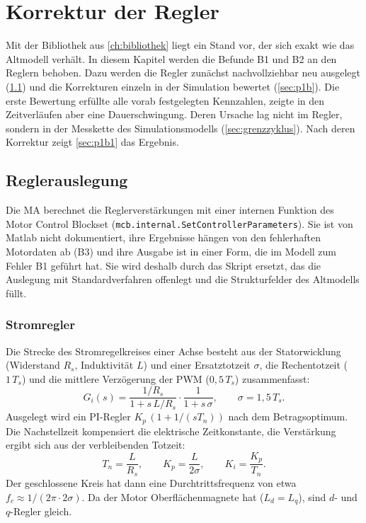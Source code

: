 \chapter{Korrektur der Regler}
\label{ch:regler}

Mit der Bibliothek aus \cref{ch:bibliothek} liegt ein Stand vor, der sich exakt wie das
Altmodell verhält. In diesem Kapitel werden die Befunde B1 und B2 an den Reglern behoben.
Dazu werden die Regler zunächst nachvollziehbar neu ausgelegt
(\cref{sec:auslegung}) und die Korrekturen einzeln in der Simulation bewertet
(\cref{sec:p1b}). Die erste Bewertung erfüllte alle vorab festgelegten Kennzahlen, zeigte in
den Zeitverläufen aber eine Dauerschwingung. Deren Ursache lag nicht im Regler, sondern in der
Messkette des Simulationsmodells (\cref{sec:grenzzyklus}). Nach deren Korrektur zeigt
\cref{sec:p1b1} das Ergebnis.

\section{Reglerauslegung}
\label{sec:auslegung}

Die \ac{MA} berechnet die Reglerverstärkungen mit einer internen Funktion des Motor Control
Blockset (\texttt{mcb.internal.\allowbreak SetControllerParameters}). Sie ist von Matlab nicht dokumentiert, ihre Ergebnisse
hängen von den fehlerhaften Motordaten ab (B3) und ihre Ausgabe ist in einer Form, die im
Modell zum Fehler B1 geführt hat. Sie wird deshalb durch das Skript
 ersetzt, das die Auslegung mit Standardverfahren offenlegt
und die Strukturfelder des Altmodells füllt.

\subsection{Stromregler}

Die Strecke des Stromregelkreises einer Achse besteht aus der Statorwicklung
(Widerstand $R_s$, Induktivität $L$) und einer Ersatztotzeit $\sigma$, die Rechentotzeit
($1\,T_s$) und die mittlere Verzögerung der \ac{PWM} ($0{,}5\,T_s$) zusammenfasst:
\begin{equation}
  G_i(s) = \frac{1/R_s}{1 + s\,L/R_s} \cdot \frac{1}{1 + s\,\sigma},
  \qquad \sigma = 1{,}5\,T_s .
\end{equation}
Ausgelegt wird ein \ac{PI}-Regler $K_p\,(1 + 1/(s T_n))$ nach dem Betragsoptimum. Die
Nachstellzeit kompensiert die elektrische Zeitkonstante, die Verstärkung ergibt sich aus der
verbleibenden Totzeit:
\begin{equation}
  T_n = \frac{L}{R_s}, \qquad K_p = \frac{L}{2\sigma}, \qquad K_i = \frac{K_p}{T_n}.
\end{equation}
Der geschlossene Kreis hat dann eine Durchtrittsfrequenz von etwa
$f_c \approx 1/(2\pi \cdot 2\sigma)$. Da der Motor Oberflächenmagnete hat
($L_d = L_q$), sind $d$- und $q$-Regler gleich.

